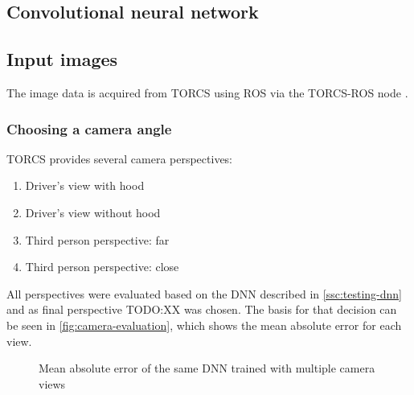 \documentclass[10pt,a4paper,twoside,journal]{IEEEtran}
\begin{document}
\subsection{Convolutional neural network}

\subsection{Input images}
The image data is acquired from TORCS \cite{TORCS} using ROS via the TORCS-ROS node \cite{mirus_torcs-ros_2017}. 

\subsubsection{Choosing a camera angle}
TORCS provides several camera perspectives: 
\begin{enumerate}
	\item Driver's view with hood
	\item Driver's view without hood
	\item Third person perspective: far
	\item Third person perspective: close
\end{enumerate}
All perspectives were evaluated based on the DNN described in \autoref{ssc:testing-dnn} 
and as final perspective TODO:XX was chosen. The basis for that decision can be seen in 
\autoref{fig:camera-evaluation}, which shows the mean absolute error for each view.
\begin{figure}
	\centering
	\fbox{\rule{0pt}{2cm} \rule{1.0\linewidth}{0pt}}
	\caption{Mean absolute error of the same DNN trained with multiple camera views}
	\label{fig:camera-evaluation}
\end{figure}
\end{document}
